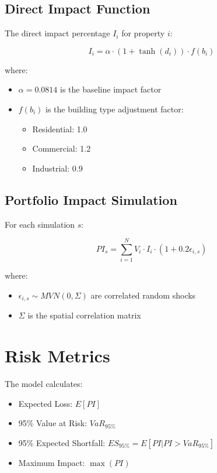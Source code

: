 \documentclass{article}
\begin{document}
\subsection{Direct Impact Function}
The direct impact percentage $I_i$ for property $i$:

\begin{equation}
I_i = \alpha \cdot (1 + \tanh(d_i)) \cdot f(b_i)
\end{equation}

where:
\begin{itemize}
    \item $\alpha = 0.0814$ is the baseline impact factor
    \item $f(b_i)$ is the building type adjustment factor:
    \begin{itemize}
        \item Residential: 1.0
        \item Commercial: 1.2
        \item Industrial: 0.9
    \end{itemize}
\end{itemize}

\subsection{Portfolio Impact Simulation}
For each simulation $s$:

\begin{equation}
PI_s = \sum_{i=1}^{N} V_i \cdot I_i \cdot (1 + 0.2 \epsilon_{i,s})
\end{equation}

where:
\begin{itemize}
    \item $\epsilon_{i,s} \sim MVN(0, \Sigma)$ are correlated random shocks
    \item $\Sigma$ is the spatial correlation matrix
\end{itemize}

\section{Risk Metrics}
The model calculates:
\begin{itemize}
    \item Expected Loss: $E[PI]$
    \item 95\% Value at Risk: $VaR_{95\%}$
    \item 95\% Expected Shortfall: $ES_{95\%} = E[PI|PI > VaR_{95\%}]$
    \item Maximum Impact: $\max(PI)$
\end{itemize}
\end{document}

